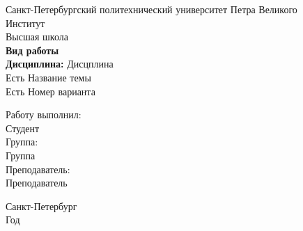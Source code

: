 \documentclass[12pt,a4paper]{scrartcl}
\begin{document}
\begin{titlepage}
\begin{center}

\large
Санкт-Петербургский политехнический университет Петра Великого %
\\
Институт %
\\
Высшая школа %
\\[5.5cm]


\large \textbf{
Вид работы %
}\\
\large \textbf{Дисциплина:}
Дисцплина %
\\
Есть %
Название темы %
\\
Есть %
Номер варианта %
\\ [3.7cm]


\end{center}

\vfill

\hfill\begin{minipage}{0.25\textwidth}
  Работу выполнил:\\
Студент %
  \\
  Группа:\\
Группа %
    \\
    Преподаватель:\\
Преподаватель %
    \\
\end{minipage}%

\vfill

\begin{center}
\large Санкт-Петербург %
\\
Год %
\end{center} 

\end{titlepage}
\end{document}
